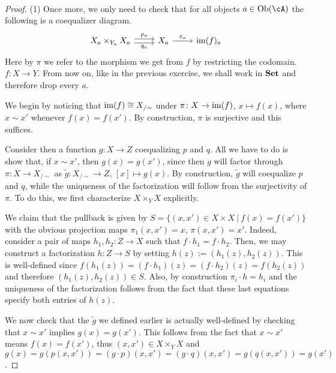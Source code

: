 \documentclass[a4paper,11pt,openany]{scrartcl}
\begin{document}
~\\
\begin{proof}
    (1) Once more, we only need to check that for all objects $a\in\Ob(\cA)$ the
    following is a coequalizer diagram.
    \[\begin{tikzcd}
	{X_a\times_{Y_a}X_a} & {X_a} & {\im(f)_a}
	\arrow["{p_a}", from=1-1, to=1-2, shift left=1]
	\arrow["{q_a}"', from=1-1, to=1-2, shift right=1]
	\arrow["{\pi_a}"', from=1-2, to=1-3, swap]
    \end{tikzcd}\]
    Here by $\pi$ we refer to the morphism we get from $f$ by restricting the
    codomain. $f\colon X\rightarrow Y$. From now on, like in the previous
    exercise, we shall work in $\operatorname{\mathbf{Set}}$ and therefore drop every $a$.

    We begin by noticing that $\operatorname{im}(f)\cong X_{/\sim}$ under $\pi\colon
    X\rightarrow\operatorname{im}(f)$, $x\mapsto f(x)$, where $x\sim x'$
    whenever $f(x)=f(x')$. By construction, $\pi$ is surjective and this
    suffices.

    Consider then a function $g\colon X\rightarrow Z$ coequalizing $p$ and $q$.
    All we have to do is show that, if $x\sim x'$, then $g(x)=g(x')$, since then
    $g$ will factor through $\pi\colon X\rightarrow X_{/\sim}$ as
    $\tilde{g}\colon X_{/\sim}\rightarrow Z$, $[x]\mapsto g(x)$. By construction,
    $\tilde{g}$ will coequalize $p$ and $q$, while the uniqueness of the
    factorization will follow from the surjectivity of $\pi$. To do this, we
    first characterize $X\times_YX$ explicitly.

    We claim that the pullback is given by $S=\{(x,x')\in X\times X\ |\
    f(x)=f(x')\}$ with the obvious projection maps $\pi_1(x,x')=x$,
    $\pi(x,x')=x'$. Indeed, consider a pair of maps $h_1,h_2\colon Z\rightarrow
    X$ such that $f\cdot h_1=f\cdot h_2$. Then, we may construct a factorization
    $h\colon Z\rightarrow S$ by setting $h(z):=(h_1(z),h_2(z))$. This is
    well-defined since $f(h_1(z))=(f\cdot h_1)(z)=(f\cdot h_2)(z)=f(h_2(z))$ and
    therefore $(h_1(z),h_2(z))\in S$. Also, by construction $\pi_i\cdot h=h_i$
    and the uniqueness of the factorization follows from the fact that these
    last equations specify both entries of $h(z)$.

    We now check that the $\tilde{g}$ we defined earlier is actually
    well-defined by checking that $x\sim x'$ implies $g(x)=g(x')$. This follows
    from the fact that $x\sim x'$ means $f(x)=f(x')$, thus $(x,x')\in
    X\times_YX$ and $g(x)=g(p(x,x'))=(g\cdot p)(x,x')=(g\cdot
    q)(x,x')=g(q(x,x'))=g(x')$.


\end{proof}
\end{document}
